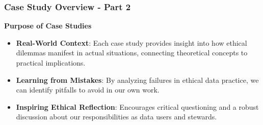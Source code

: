 \documentclass[aspectratio=169]{beamer}
\begin{document}
\begin{frame}[fragile]
    \frametitle{Case Study Overview - Part 2}
    \textbf{Purpose of Case Studies}

    \begin{itemize}
        \item \textbf{Real-World Context}: Each case study provides insight into how ethical dilemmas manifest in actual situations, connecting theoretical concepts to practical implications.
        \item \textbf{Learning from Mistakes}: By analyzing failures in ethical data practice, we can identify pitfalls to avoid in our own work.
        \item \textbf{Inspiring Ethical Reflection}: Encourages critical questioning and a robust discussion about our responsibilities as data users and stewards.
    \end{itemize}
\end{frame}
\end{document}
